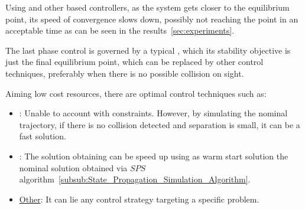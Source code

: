 Using  and other  based controllers, as the system gets closer to the equilibrium point, its speed of convergence slows down, possibly not reaching the point in an acceptable time as can be seen in the results~\ref{sec:experiments}. \par
The  last phase control is governed by a typical , which its  stability objective is just the final equilibrium point, which can be replaced by other control techniques, preferably when there is no possible collision on sight.

Aiming low cost resources, there are optimal control techniques such as:

\begin{itemize}
    \item \underline{}: Unable to account with constraints. However, by simulating the nominal  trajectory, if there is no collision detected and separation is small, it can be a fast solution.
    \item \underline{}: The solution obtaining can be speed up using as warm start solution the nominal  solution obtained via \(SPS\) algorithm~\ref{subsub:State_Propagation_Simulation_Algorithm}.
    \item \underline{Other}: It can lie any control strategy targeting a specific problem.
\end{itemize}






























\endinput































